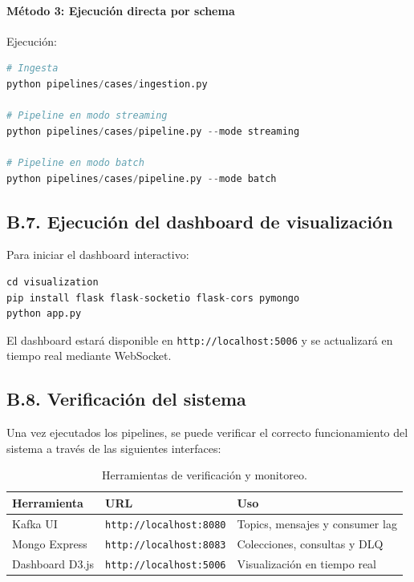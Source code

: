 \documentclass[12pt,a4paper]{article}
\begin{document}
\par

\paragraph{Método 3: Ejecución directa por schema}

Ejecución:\\

\begin{lstlisting}[language=Python, caption=Ejecucion-paso-paso]
# Ingesta
python pipelines/cases/ingestion.py

# Pipeline en modo streaming
python pipelines/cases/pipeline.py --mode streaming

# Pipeline en modo batch
python pipelines/cases/pipeline.py --mode batch
\end{lstlisting}

\subsection*{B.7. Ejecución del dashboard de visualización}

Para iniciar el dashboard interactivo:

\begin{lstlisting}[language=Python, caption=visualizacion]
cd visualization
pip install flask flask-socketio flask-cors pymongo
python app.py
\end{lstlisting}

El dashboard estará disponible en \texttt{http://localhost:5006} y se actualizará en tiempo real mediante WebSocket.

\subsection*{B.8. Verificación del sistema}

Una vez ejecutados los pipelines, se puede verificar el correcto funcionamiento del sistema a través de las siguientes interfaces:

\begin{table}[h!]
    \centering
    \begin{tabular}{|l|l|l|}
        \hline
        \textbf{Herramienta} & \textbf{URL}                   & \textbf{Uso}                    \\ \hline
        Kafka UI             & \texttt{http://localhost:8080} & Topics, mensajes y consumer lag \\ \hline
        Mongo Express        & \texttt{http://localhost:8083} & Colecciones, consultas y DLQ    \\ \hline
        Dashboard D3.js      & \texttt{http://localhost:5006} & Visualización en tiempo real    \\ \hline
    \end{tabular}
    \caption{Herramientas de verificación y monitoreo.}
\end{table}
\end{document}

